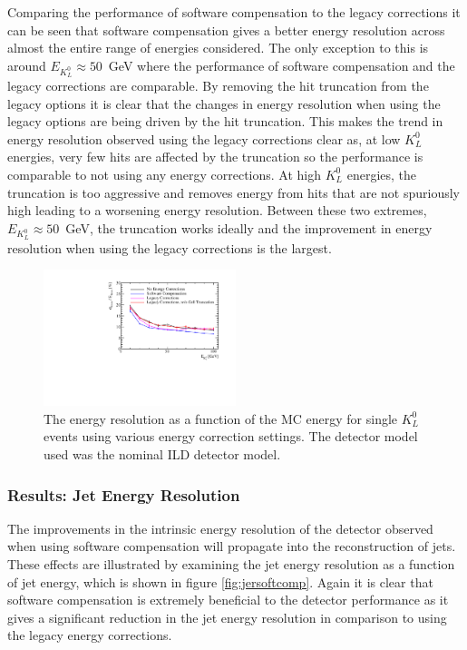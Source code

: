 Comparing the performance of software compensation to the legacy corrections it can be seen that software compensation gives a better energy resolution across almost the entire range of energies considered.  The only exception to this is around $E_{K^{0}_{L}} \approx 50$~GeV where the performance of software compensation and the legacy corrections are comparable.  By removing the hit truncation from the legacy options it is clear that the changes in energy resolution when using the legacy options are being driven by the hit truncation.  This makes the trend in energy resolution observed using the legacy corrections clear as, at low $K^{0}_{L}$ energies, very few hits are affected by the truncation so the performance is comparable to not using any energy corrections.  At high $K^{0}_{L}$ energies, the truncation is too aggressive and removes energy from hits that are not spuriously high leading to a worsening energy resolution.  Between these two extremes, $E_{K^{0}_{L}} \approx 50$~GeV, the truncation works ideally and the improvement in energy resolution when using the legacy corrections is the largest.  

\begin{figure}[h!]
\includegraphics[width=0.5\textwidth]{EnergyEstimators/Plots/SoftComp/EnergyResolution/ER_vs_Kaon0LSoftComp_Kaon0L.pdf}
\caption[The energy resolution as a function of the MC energy for single $K^{0}_{L}$ events using various energy correction settings.  The detector model used was the nominal ILD detector model.]{The energy resolution as a function of the MC energy for single $K^{0}_{L}$ events using various energy correction settings.  The detector model used was the nominal ILD detector model.}
\label{fig:ersoftcomp}
\end{figure}


\subsubsection{Results: Jet Energy Resolution}
The improvements in the intrinsic energy resolution of the detector observed when using software compensation will propagate into the reconstruction of jets.  These effects are illustrated by examining the jet energy resolution as a function of jet energy, which is shown in figure \ref{fig:jersoftcomp}.  Again it is clear that software compensation is extremely beneficial to the detector performance as it gives a significant reduction in the jet energy resolution in comparison to using the legacy energy corrections.  

